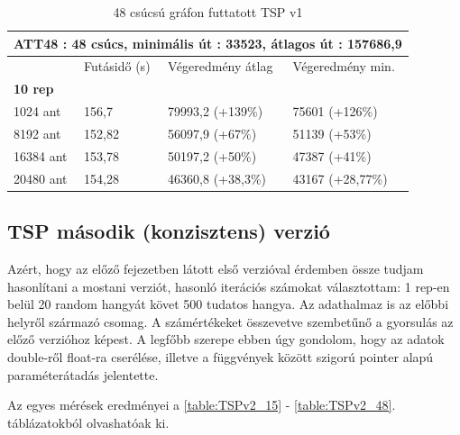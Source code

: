 \begin{table}[htbp!]
	\centering
	\begin{tabular}{|p{2cm}||p{3cm}|p{3.5cm}|p{3.5cm}|}
		\hline
		\multicolumn{4}{|c|}{ATT48 : 48 csúcs, minimális út : 33523, átlagos út : 157686,9} \\
		\hline
		& Futásidő (s) & Végeredmény átlag & Végeredmény min.\\
		\hline
		\textbf{10 rep} & & & \\
		1024 ant & 156,7 & 79993,2 (+139\%) & 75601 (+126\%) \\
		8192 ant & 152,82 & 56097,9 (+67\%) & 51139 (+53\%) \\
		16384 ant & 153,78 & 50197,2 (+50\%) & 47387 (+41\%) \\
		20480 ant & 154,28 & 46360,8 (+38,3\%) & 43167 (+28,77\%) \\
		\hline
	\end{tabular}
	\caption{48 csúcsú gráfon futtatott TSP v1}
	\label{table:TSPv1_48}
\end{table}

\newpage
\newpage

\subsection{TSP második (konzisztens) verzió}
Azért, hogy az előző fejezetben látott első verzióval érdemben össze tudjam hasonlítani a mostani verziót, hasonló iterációs számokat választottam: 1 rep-en belül 20 random hangyát követ 500 tudatos hangya. Az adathalmaz is az előbbi \cite{TSPdataset} helyről származó csomag. A számértékeket összevetve szembetűnő a gyorsulás az előző verzióhoz képest. A legfőbb szerepe ebben úgy gondolom, hogy az adatok double-ről float-ra cserélése, illetve a függvények között szigorú pointer alapú paraméterátadás jelentette.

Az egyes mérések eredményei a \ref{table:TSPv2_15} - \ref{table:TSPv2_48}. táblázatokból olvashatóak ki.

